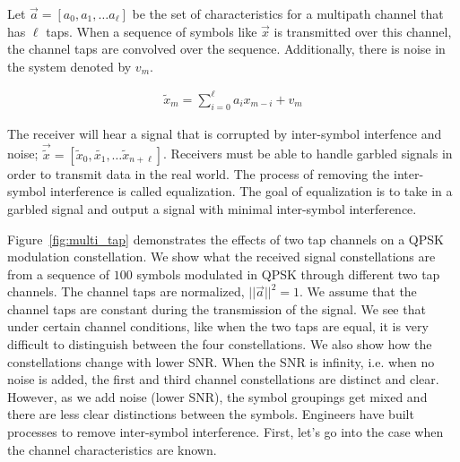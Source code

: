 Let $\vec{a} = [a_0, a_1, \ldots a_{\ell}]$ be the set of characteristics for a multipath channel that has $\ell$ taps. When a sequence of symbols like $\vec{x}$ is transmitted over this channel, the channel taps are convolved over the sequence.  Additionally, there is noise in the system denoted by $v_m$. 

\begin{align}
\tilde{x}_m = \sum_{i=0}^{\ell} a_i x_{m-i} + v_m
\end{align}

The receiver will hear a signal that is corrupted by inter-symbol interfence and noise;
$\vec{\tilde{x}}=[\tilde{x}_0, \tilde{x_1}, \ldots \tilde{x}_{n+\ell}]$. 
Receivers must be able to handle garbled signals in order to transmit data in the real world.  The process of removing the inter-symbol interference is called equalization.  The goal of equalization is to take in a garbled signal and output a signal with minimal inter-symbol interference. 

Figure~\ref{fig:multi_tap} demonstrates the effects of two tap channels on a QPSK modulation constellation.  
We show what the received signal constellations are from a sequence of $100$ symbols modulated in QPSK through different two tap channels.  The channel taps are normalized, $||\vec{a}||^2=1$.  We assume that the channel taps are constant during the transmission of the signal.
We see that under certain channel conditions, like when the two taps are equal, it is very difficult to distinguish between the four constellations.  
We also show how the constellations change with lower SNR.  When the SNR is infinity, i.e. when no noise is added, the first and third channel constellations are distinct and clear.  However, as we add noise (lower SNR), the symbol groupings get mixed and there are less clear distinctions between the symbols.
Engineers have built processes to remove inter-symbol interference.  First, let's go into the case when the channel characteristics are known.

